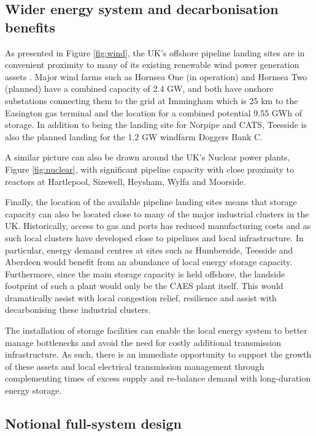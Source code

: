 \documentclass[preprint,12pt]{elsarticle}
\begin{document}
\subsection{Wider energy system and decarbonisation benefits}
\label{sec:energysystem}
As presented in Figure \ref{fig:wind}, the UK's offshore pipeline landing sites are in convenient proximity to many of its existing renewable wind power generation assets \cite{OGAmap}. Major wind farms such as Hornsea One (in operation) and Hornsea Two (planned) have a combined capacity of 2.4 GW, and both have onshore substations connecting them to the grid at Immingham which is 25 km to the Easington gas terminal and the location for a combined potential 9.55 GWh of storage. In addition to being the landing site for Norpipe and CATS, Teesside is also the planned landing for the 1.2 GW windfarm Doggers Bank C.

A similar picture can also be drawn around the UK's Nuclear power plants, Figure \ref{fig:nuclear}, with significant pipeline capacity with close proximity to reactors at Hartlepool, Sizewell, Heysham, Wylfa and Moorside.

Finally, the location of the available pipeline landing sites means that storage capacity can also be located close to many of the major industrial clusters in the UK. Historically, access to gas and ports has reduced manufacturing costs and as such local clusters have developed close to pipelines and local infrastructure. In particular, energy demand centres at sites such as Humberside, Teesside and Aberdeen would benefit from an abundance of local energy storage capacity. Furthermore, since the main storage capacity is held offshore, the landside footprint of such a plant would only be the CAES plant itself. This would dramatically assist with local congestion relief, resilience and assist with decarbonising these industrial clusters.
    
The installation of storage facilities can enable the local energy system to better manage bottlenecks and avoid the need for costly additional transmission infrastructure. As such, there is an immediate opportunity to support the growth of these assets and local electrical transmission management through complementing times of excess supply and re-balance demand with long-duration energy storage.
\subsection{Notional full-system design}
\end{document}
